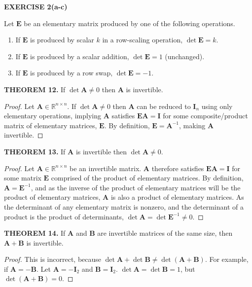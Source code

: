 \documentclass[12pt]{article}
\newcommand{\mat}[1]{\mathbf{#1}}
\newcommand{\exercise}[1]{\textbf{EXERCISE #1}\label{#1}}
\newcommand{\theorem}[2]{\textbf{THEOREM #1.} #2}
\begin{document}
\exercise{2(a-c)}

Let $\mat{E}$ be an elementary matrix produced by one of the following operations. 
\begin{enumerate}
\item If $\mat{E}$ is produced by scalar $k$ in a row-scaling operation, $\det \mat{E} = k.$
\item If $\mat{E}$ is produced by a scalar addition, $\det \mat{E} = 1$ (unchanged).
\item If $\mat{E}$ is produced by a row swap, $\det \mat{E} = -1$.
\end{enumerate}

\theorem{12}{If $\det \mat{A} \neq 0$ then $\mat{A}$ is invertible.}

\begin{proof}
Let $\mat{A} \in \mathbb{R}^{n \times n}$. If $\det \mat{A} \neq 0$ then $\mat{A}$ can be reduced to $\mat{I}_{n}$ using only elementary operations, implying $\mat{A}$ satisfies $\mat{EA} = \mat{I}$ for some composite/product matrix of elementary matrices, $\mat{E}$. By definition, $\mat{E} = \mat{A}^{-1}$, making $\mat{A}$ invertible.
\end{proof}

\theorem{13}{If $\mat{A}$ is invertible then $\det \mat{A} \neq 0$.}

\begin{proof}
Let $\mat{A} \in \mathbb{R}^{n \times n}$ be an invertible matrix. $\mat{A}$ therefore satisfies $\mat{EA} = \mat{I}$ for some matrix $\mat{E}$ comprised of the product of elementary matrices. By definition, $\mat{A} = \mat{E}^{-1}$, and as the inverse of the product of elementary matrices will be the product of elementary matrices, $\mat{A}$ is also a product of elementary matrices. As the determinant of any elementary matrix is nonzero, and the determinant of a product is the product of determinants, $\det \mat{A} = \det \mat{E}^{-1} \neq 0$. 
\end{proof}

\theorem{14}{If $\mat{A}$ and $\mat{B}$ are invertible matrices of the same size, then $\mat{A} + \mat{B}$ is invertible.}

\begin{proof}
This is incorrect, because $\det \mat{A} + \det \mat{B} \neq \det ( \mat{A} + \mat{B} )$. For example, if $\mat{A} = -\mat{B}$. Let $\mat{A} = -\mat{I}_{2}$ and $\mat{B} = \mat{I}_{2}$. $\det \mat{A} = \det \mat{B} = 1$, but $\det ( \mat{A} + \mat{B} ) = 0$.
\end{proof}
\end{document}
